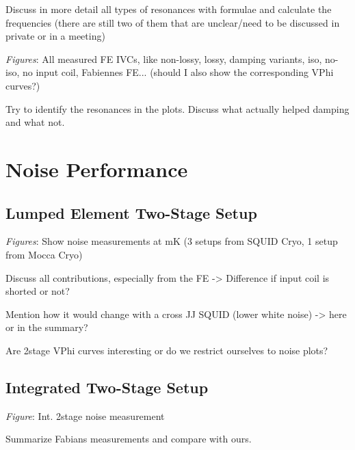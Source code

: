 Discuss in more detail all types of resonances with formulae and calculate the frequencies (there are still two of them that are unclear/need to be discussed in private or in a meeting)

\textit{Figures}: All measured FE IVCs, like non-lossy, lossy, damping variants, iso, no-iso, no input coil, Fabiennes FE... (should I also show the corresponding VPhi curves?)

Try to identify the resonances in the plots. Discuss what actually helped damping and what not. 

\section{Noise Performance}

\subsection{Lumped Element Two-Stage Setup}

\textit{Figures}: Show noise measurements at mK (3 setups from SQUID Cryo, 1 setup from Mocca Cryo) 

Discuss all contributions, especially from the FE -> Difference if input coil is shorted or not?

Mention how it would change with a cross JJ SQUID (lower white noise) -> here or in the summary?

Are 2stage VPhi curves interesting or do we restrict ourselves to noise plots?

\subsection{Integrated Two-Stage Setup}

\textit{Figure}: Int. 2stage noise measurement

Summarize Fabians measurements and compare with ours. 